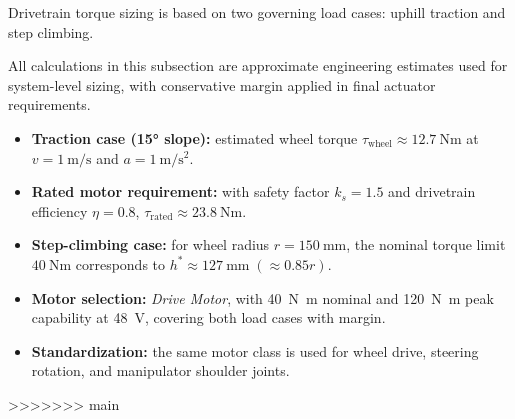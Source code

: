 Drivetrain torque sizing is based on two governing load cases: uphill traction and step climbing.

All calculations in this subsection are approximate engineering estimates used for system-level sizing, with conservative margin applied in final actuator requirements.

\begin{itemize}[leftmargin=1.2em, itemsep=0.2em, topsep=0.3em]
  \item \textbf{Traction case (\ang{15} slope):} estimated wheel torque
  $\tau_\mathrm{wheel}\approx\SI{12.7}{\newton\metre}$ at
  $v=\SI{1}{\metre\per\second}$ and
  $a=\SI{1}{\metre\per\second\squared}$.

  \item \textbf{Rated motor requirement:} with safety factor
  $k_s=1.5$ and drivetrain efficiency $\eta=0.8$,
  $\tau_\mathrm{rated}\approx\SI{23.8}{\newton\metre}$.

  \item \textbf{Step-climbing case:} for wheel radius
  $r=\SI{150}{\milli\metre}$, the nominal torque limit
  $\SI{40}{\newton\metre}$ corresponds to
  $h^*\approx\SI{127}{\milli\metre}\;(\approx0.85r)$.

  \item \textbf{Motor selection:} \textit{Drive Motor},
  with \SI{40}{\newton\metre} nominal and
  \SI{120}{\newton\metre} peak capability at 48~V,
  covering both load cases with margin.

  \item \textbf{Standardization:} the same motor class is used for
  wheel drive, steering rotation, and manipulator shoulder joints.
\end{itemize}
>>>>>>> main


